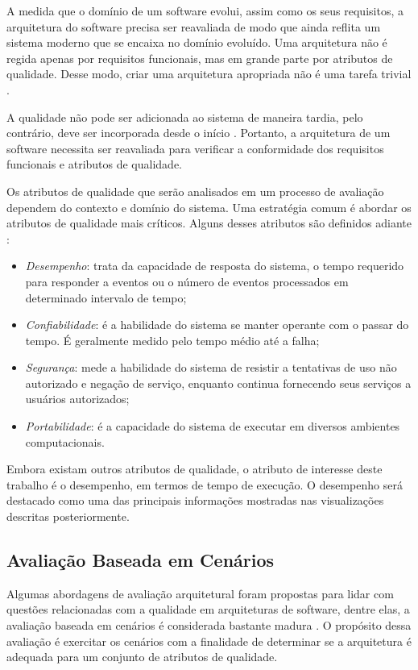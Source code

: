 A medida que o domínio de um software evolui, assim como os seus requisitos, a arquitetura do software precisa ser reavaliada de modo que ainda reflita um sistema moderno que se encaixa no domínio evoluído. Uma arquitetura não é regida apenas por requisitos funcionais, mas em grande parte por atributos de qualidade. Desse modo, criar uma arquitetura apropriada não é uma tarefa trivial \cite{Svahnberg2002}.

A qualidade não pode ser adicionada ao sistema de maneira tardia, pelo contrário, deve ser incorporada desde o início \cite{Svahnberg2002}. Portanto, a arquitetura de um software necessita ser reavaliada para verificar a conformidade dos requisitos funcionais e atributos de qualidade.

Os atributos de qualidade que serão analisados em um processo de avaliação dependem do contexto e domínio do sistema. Uma estratégia comum é abordar os atributos de qualidade mais críticos. Alguns desses atributos são definidos adiante \cite{Kazman2001}:
\begin{itemize}
	\item \textit{Desempenho}: trata da capacidade de resposta do sistema, o tempo requerido para responder a eventos ou o número de eventos processados em determinado intervalo de tempo;
	\item \textit{Confiabilidade}: é a habilidade do sistema se manter operante com o passar do tempo. É geralmente medido pelo tempo médio até a falha;
	\item \textit{Segurança}: mede a habilidade do sistema de resistir a tentativas de uso não autorizado e negação de serviço, enquanto continua fornecendo seus serviços a usuários autorizados;
	\item \textit{Portabilidade}: é a capacidade do sistema de executar em diversos ambientes computacionais.
\end{itemize}

Embora existam outros atributos de qualidade, o atributo de interesse deste trabalho é o desempenho, em termos de tempo de execução. O desempenho será destacado como uma das principais informações mostradas nas visualizações descritas posteriormente.

\subsection{Avaliação Baseada em Cenários} \label{subsec:avaliacao-baseada-cenarios}

Algumas abordagens de avaliação arquitetural foram propostas para lidar com questões relacionadas com a qualidade em arquiteturas de software, dentre elas, a avaliação baseada em cenários é considerada bastante madura \cite{Babar2004}. O propósito dessa avaliação é exercitar os cenários com a finalidade de determinar se a arquitetura é adequada para um conjunto de atributos de qualidade.

